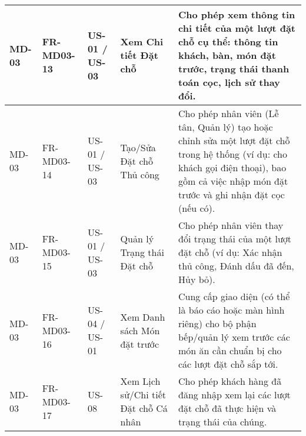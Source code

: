 \begin{longtable}{|m{2cm}|m{2.5cm}|m{2cm}|m{4.5cm}|m{4cm}|}
\hline
MD-03 & FR-MD03-13 & US-01 / US-03 & Xem Chi tiết Đặt chỗ & Cho phép xem thông tin chi tiết của một lượt đặt chỗ cụ thể: thông tin khách, bàn, món đặt trước, trạng thái thanh toán cọc, lịch sử thay đổi. \\
\hline
MD-03 & FR-MD03-14 & US-01 / US-03 & Tạo/Sửa Đặt chỗ Thủ công & Cho phép nhân viên (Lễ tân, Quản lý) tạo hoặc chỉnh sửa một lượt đặt chỗ trong hệ thống (ví dụ: cho khách gọi điện thoại), bao gồm cả việc nhập món đặt trước và ghi nhận đặt cọc (nếu có). \\
\hline
MD-03 & FR-MD03-15 & US-01 / US-03 & Quản lý Trạng thái Đặt chỗ & Cho phép nhân viên thay đổi trạng thái của một lượt đặt chỗ (ví dụ: Xác nhận thủ công, Đánh dấu đã đến, Hủy bỏ). \\
\hline
MD-03 & FR-MD03-16 & US-04 / US-01 & Xem Danh sách Món đặt trước & Cung cấp giao diện (có thể là báo cáo hoặc màn hình riêng) cho bộ phận bếp/quản lý xem trước các món ăn cần chuẩn bị cho các lượt đặt chỗ sắp tới. \\
\hline
MD-03 & FR-MD03-17 & US-08 & Xem Lịch sử/Chi tiết Đặt chỗ Cá nhân & Cho phép khách hàng đã đăng nhập xem lại các lượt đặt chỗ đã thực hiện và trạng thái của chúng. \\
\hline


\end{longtable}

